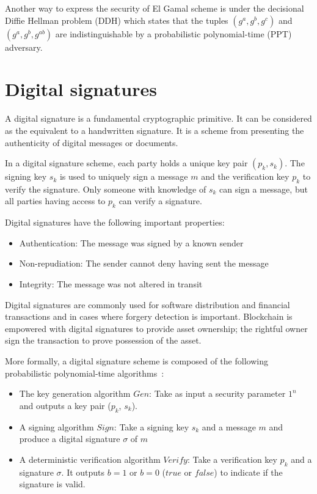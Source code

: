 Another way to express the security of El Gamal scheme is under the decisional Diffie Hellman problem (DDH) which states that the tuples $(g^a, g^b, g^c)$ and $(g^a, g^b, g^{ab})$ are indistinguishable by a probabilistic polynomial-time (PPT) adversary.

\section{Digital signatures}
\label{preliminaries:sign}

A digital signature is a fundamental cryptographic primitive. It can be considered as the equivalent to a handwritten signature. It is a scheme from presenting the authenticity of digital messages or documents.

In a digital signature scheme, each party holds a unique key pair $(p_k, s_k)$. The signing key $s_k$ is used to uniquely sign a message $m$ and the verification key $p_k$ to verify the signature. Only someone with knowledge of $s_k$ can sign a message, but all parties having access to $p_k$ can verify a signature.

Digital signatures have the following important properties:

\begin{itemize}
  \item Authentication: The message was signed by a known sender
  \item Non-repudiation: The sender cannot deny having sent the message
  \item Integrity: The message was not altered in transit
\end{itemize}

Digital signatures are commonly used for software distribution and financial transactions and in cases where forgery detection is important. Blockchain is empowered with digital signatures to provide asset ownership; the rightful owner sign the transaction to prove possession of the asset.

More formally, a digital signature scheme is composed of the following probabilistic polynomial-time algorithms~\cite{Katz:2014:IMC:2700550,kiagias:crypto}:

\begin{itemize}
  \item The key generation algorithm $Gen$: Take as input a security parameter $1^{n}$ and outputs a key pair ($p_k$, $s_k$).
  \item A signing algorithm $Sign$: Take a signing key $s_k$ and a message $m$ and produce a digital signature $\sigma$ of $m$
  \item A deterministic verification algorithm $Verify$: Take a verification key $p_k$ and a signature $\sigma$. It outputs $b=1$ or $b=0$ ($true$ or $false$) to indicate if the signature is valid.
\end{itemize}

